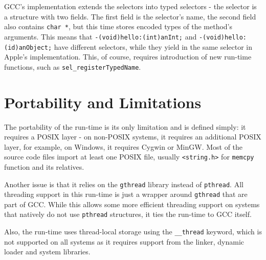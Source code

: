 GCC's implementation extends the selectors into typed selectors - the selector is a structure with two fields. The first field is the selector's name, the second field also contains \verb=char *=, but this time stores encoded types of the method's arguments. This means that \verb=-(void)hello:(int)anInt;= and \verb=-(void)hello:(id)anObject;= have different selectors, while they yield in the same selector in Apple's implementation. This, of course, requires introduction of new run-time functions, such as \verb=sel_registerTypedName=.

\section{Portability and Limitations}

The portability of the run-time is its only limitation and is defined simply: it requires a POSIX layer - on non-POSIX systems, it requires an additional POSIX layer, for example, on Windows, it requires Cygwin or MinGW. Most of the source code files import at least one POSIX file, usually \verb=<string.h>= for \verb=memcpy= function and its relatives.

Another issue is that it relies on the \verb=gthread= library instead of \verb=pthread=. All threading support in this run-time is just a wrapper around \verb=gthread= that are part of GCC. While this allows some more efficient threading support on systems that natively do not use \verb=pthread= structures, it ties the run-time to GCC itself.

Also, the run-time uses thread-local storage using the \verb=__thread= keyword, which is not supported on all systems as it requires support from the linker, dynamic loader and system libraries\cite{thread_local_storage}.
